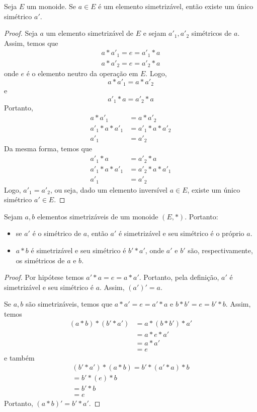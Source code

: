 \begin{prop}
Seja $E$ um monoide. Se $a\in E$ é um elemento simetrizável, então existe um único simétrico $a'$.
\begin{proof}
Seja $a$ um elemento simetrizável de $E$ e sejam $a'_1, a'_2$ simétricos de $a$. Assim, temos que
\begin{align*}
a*a'_1=e=a'_1*a \\
a*a'_2=e=a'_2*a
\end{align*}
onde $e$ é o elemento neutro da operação em $E$. Logo, \[a*a'_1=a*a'_2\] e \[a'_1*a=a'_2*a\]
Portanto,
\begin{align*}
a*a'_1&=a*a'_2 \\
a'_1*a*a'_1&=a'_1*a*a'_2\\
a'_1&=a'_2
\end{align*}
Da mesma forma, temos que 
\begin{align*}
a'_1*a&=a'_2*a \\
a'_1*a*a'_1&=a'_2*a*a'_1\\
a'_1&=a'_2
\end{align*}
Logo, $a'_1=a'_2$, ou seja, dado um elemento inversível $a \in E$, existe um único simétrico $a' \in E$.
\end{proof}
\end{prop}
\begin{prop}
Sejam $a,b$ elementos simetrizáveis de um monoide $(E,*)$. Portanto:
\begin{itemize}
\item se $a'$ é o simétrico de $a$, então $a'$ é simetrizável e seu simétrico é o próprio $a$.
\item $a*b$ é simetrizável e seu simétrico é $b'*a'$, onde $a'$ e $b'$ são, respectivamente, os simétricos de $a$ e $b$.
\end{itemize}
\begin{proof}
Por hipótese temos $a'*a=e=a*a'$. Portanto, pela definição, $a'$ é simetrizável e seu simétrico é $a$. Assim, $(a')'=a$. \par Se $a,b$ são simetrizáveis, temos que $a*a'=e=a'*a$ e $b*b'=e=b'*b$. Assim, temos \begin{align*}
(a*b)*(b'*a')&=a*(b*b')*a' \\
&=a*e*a' \\
&=a*a' \\
&=e
\end{align*} e também \begin{align*}
(b'*a')*(a*b)=b'*(a'*a)*b \\
=b'*(e)*b \\
=b'*b \\
=e
\end{align*}
Portanto, $(a*b)'=b'*a'$.
\end{proof}
\end{prop}


